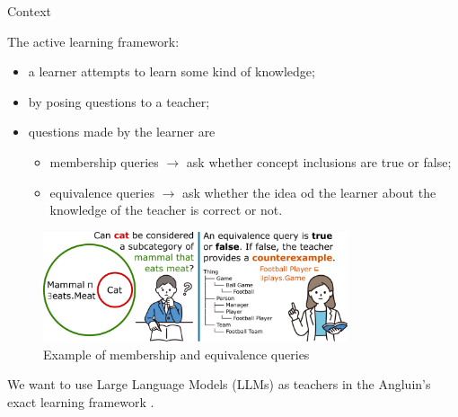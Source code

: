 \documentclass[handout]{beamer}\mode<handout>{\usetheme{AMSBolognaFC}}
\begin{document}
\begin{frame}[c, allowframebreaks]{Context}

    \vfill
    
    The \alert{active learning} framework:
    \vfill
    \begin{itemize}
        \item a \alert{learner} attempts to learn some kind of \alert{knowledge};
        \item by posing questions to a \alert{teacher};

        \vfill

        \item questions made by the learner are
        \begin{itemize}
            \item \alert{membership} queries $\rightarrow$ ask whether \alert{concept inclusions} are true or false;
            \item \alert{equivalence} queries $\rightarrow$ ask whether the idea od the learner about the knowledge of the teacher is correct or not.
        \end{itemize}
        
        \vfill
        
    \end{itemize}

    \framebreak

    \begin{figure}
        \centering
        \includegraphics[width=0.8\textwidth]{figures/queries-example}
        \caption{Example of membership and equivalence queries}
        \label{}
    \end{figure}

    We want to use \alert{Large Language Models} (LLMs) as teachers in the \alert{Angluin}'s exact learning framework .

\end{frame}
\end{document}
